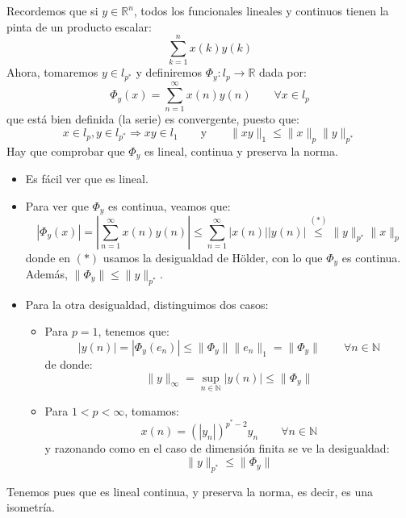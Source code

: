 \noindent
Recordemos que si $y\in \mathbb{R}^n$, todos los funcionales lineales y continuos tienen la pinta de un producto escalar:
\begin{equation*}
    \sum_{k=1}^{n}x(k)y(k)
\end{equation*}
Ahora, tomaremos $y\in l_{p^\ast}$ y definiremos $\Phi_y:l_p\to \mathbb{R}$ dada por:
\begin{equation*}
    \Phi_y(x) = \sum_{n=1}^{\infty}x(n)y(n) \qquad \forall x\in l_p
\end{equation*}
que está bien definida (la serie) es convergente, puesto que:
\begin{equation*}
    x\in l_p, y\in l_{p^\ast} \Longrightarrow xy \in l_1 \qquad \text{y}\qquad \|xy\|_1 \leq \|x\|_p \|y\|_{p^\ast}
\end{equation*}
Hay que comprobar que $\Phi_y$ es lineal, continua y preserva la norma.
\begin{itemize}
    \item Es fácil ver que es lineal.
    \item Para ver que $\Phi_y$ es continua, veamos que:
        \begin{equation*}
            |\Phi_y(x)| = \left|\sum_{n=1}^{\infty}x(n)y(n)\right| \leq \sum_{n=1}^{\infty}|x(n)||y(n)| \stackrel{(\ast)}{\leq} \|y\|_{p^\ast}\|x\|_p
        \end{equation*}
        donde en $(\ast)$ usamos la desigualdad de Hölder, con lo que $\Phi_y$ es continua. Además, $\|\Phi_y\| \leq \|y\|_{p^\ast}$.
    \item Para la otra desigualdad, distinguimos dos casos:
        \begin{itemize}
            \item Para $p=1$, tenemos que:
                \begin{equation*}
                    |y(n)| = |\Phi_y(e_n)| \leq \|\Phi_y\| \|e_n\|_1 = \|\Phi_y\| \qquad \forall n\in \mathbb{N}
                \end{equation*}
                de donde:
                \begin{equation*}
                    \|y\|_\infty = \sup_{n\in \mathbb{N}}|y(n)| \leq \|\Phi_y\|
                \end{equation*}
            \item Para $1<p<\infty$, tomamos:
                \begin{equation*}
                    x(n) = {(|y_n|)}^{p^\ast-2}y_n \qquad \forall n\in \mathbb{N}
                \end{equation*}
                y razonando como en el caso de dimensión finita se ve la desigualdad:
                \begin{equation*}
                    \|y\|_{p^\ast} \leq \|\Phi_y\|
                \end{equation*}
        \end{itemize}
\end{itemize}
Tenemos pues que 
es lineal continua, y preserva la norma, es decir, es una isometría.


